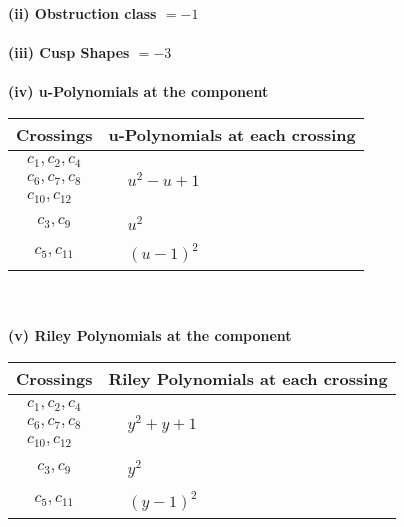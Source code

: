 \documentclass[1p]{elsarticle_modified}
\theoremstyle{definition}
\begin{document}
\flushleft \textbf{(ii) Obstruction class $= -1$}\\~\\
\flushleft \textbf{(iii) Cusp Shapes $= -3$}\\~\\
\newpage\renewcommand{\arraystretch}{1}
\flushleft \textbf{(iv) u-Polynomials at the component}\newline \\
\begin{tabular}{m{50pt}|m{274pt}}
Crossings & \hspace{64pt}u-Polynomials at each crossing \\
\hline $$\begin{aligned}c_{1},c_{2},c_{4}\\c_{6},c_{7},c_{8}\\c_{10},c_{12}\end{aligned}$$&$\begin{aligned}
&u^2- u+1
\end{aligned}$\\
\hline $$\begin{aligned}c_{3},c_{9}\end{aligned}$$&$\begin{aligned}
&u^2
\end{aligned}$\\
\hline $$\begin{aligned}c_{5},c_{11}\end{aligned}$$&$\begin{aligned}
&(u-1)^2
\end{aligned}$\\
\hline
\end{tabular}\\~\\
\newpage\renewcommand{\arraystretch}{1}
\flushleft \textbf{(v) Riley Polynomials at the component}\newline \\
\begin{tabular}{m{50pt}|m{274pt}}
Crossings & \hspace{64pt}Riley Polynomials at each crossing \\
\hline $$\begin{aligned}c_{1},c_{2},c_{4}\\c_{6},c_{7},c_{8}\\c_{10},c_{12}\end{aligned}$$&$\begin{aligned}
&y^2+y+1
\end{aligned}$\\
\hline $$\begin{aligned}c_{3},c_{9}\end{aligned}$$&$\begin{aligned}
&y^2
\end{aligned}$\\
\hline $$\begin{aligned}c_{5},c_{11}\end{aligned}$$&$\begin{aligned}
&(y-1)^2
\end{aligned}$\\
\hline
\end{tabular}\\~\\
\end{document}
